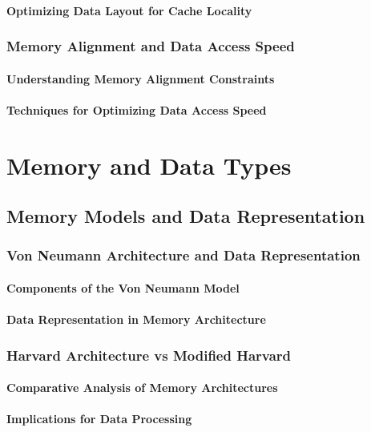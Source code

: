 \documentclass[12pt, oneside]{book}
\begin{document}
\subsubsection{Optimizing Data Layout for Cache Locality}
\subsection{Memory Alignment and Data Access Speed}
\subsubsection{Understanding Memory Alignment Constraints}
\subsubsection{Techniques for Optimizing Data Access Speed}

\chapter{Memory and Data Types}
\section{Memory Models and Data Representation}
\subsection{Von Neumann Architecture and Data Representation}
\subsubsection{Components of the Von Neumann Model}
\subsubsection{Data Representation in Memory Architecture}
\subsection{Harvard Architecture vs Modified Harvard}
\subsubsection{Comparative Analysis of Memory Architectures}
\subsubsection{Implications for Data Processing}
\end{document}
